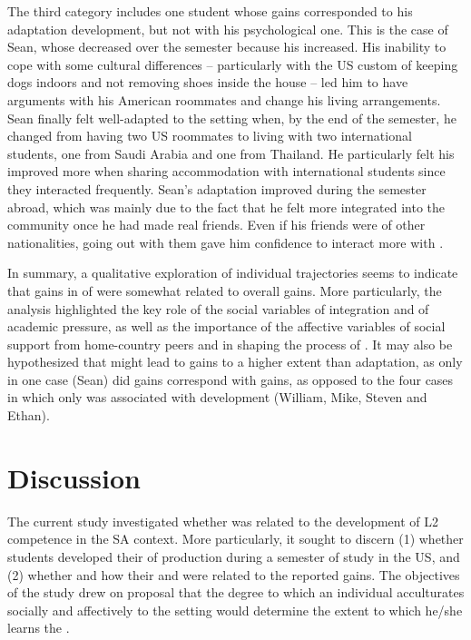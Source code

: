 \documentclass[output=paper]{langsci/langscibook}
\begin{document}
The third category includes one student whose  gains corresponded to his  adaptation development, but not with his psychological one. This is the case of Sean, whose  decreased over the semester because his  increased. His inability to cope with some cultural differences – particularly with the US custom of keeping dogs indoors and not removing shoes inside the house – led him to have arguments with his American roommates and change his living arrangements. Sean finally felt well-adapted to the setting when, by the end of the semester, he changed from having two US roommates to living with two international students, one from Saudi Arabia and one from Thailand. He particularly felt his  improved more when sharing accommodation with international students since they interacted frequently. Sean’s  adaptation improved during the semester abroad, which was mainly due to the fact that he felt more integrated into the  community once he had made real friends. Even if his friends were of other nationalities, going out with them gave him confidence to interact more with .

In summary, a qualitative exploration of individual trajectories seems to indicate that gains in  of  were somewhat related to overall  gains. More particularly, the analysis highlighted the key role of the social variables of integration and of academic pressure, as well as the importance of the affective variables of social support from home-country peers and  in shaping the process of . It may also be hypothesized that  might lead to  gains to a higher extent than  adaptation, as only in one case (Sean) did  gains correspond with  gains, as opposed to the four cases in which only  was associated with  development (William, Mike, Steven and Ethan).


\section{Discussion}
 
The current study investigated whether  was related to the development of L2  competence in the SA context. More particularly, it sought to discern (1) whether students developed their  of  production during a semester of study in the US, and (2) whether and how their  and  were related to the reported  gains. The objectives of the study drew on  proposal that the degree to which an individual acculturates socially and affectively to the  setting would determine the extent to which he/she learns the .
\end{document}
